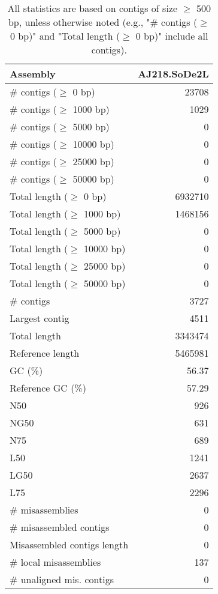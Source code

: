 \documentclass[12pt,a4paper]{article}
\begin{document}
\begin{table}[ht]
\begin{center}
\caption{All statistics are based on contigs of size $\geq$ 500 bp, unless otherwise noted (e.g., "\# contigs ($\geq$ 0 bp)" and "Total length ($\geq$ 0 bp)" include all contigs).}
\begin{tabular}{|l*{1}{|r}|}
\hline
Assembly & AJ218.SoDe2L \\ \hline
\# contigs ($\geq$ 0 bp) & 23708 \\ \hline
\# contigs ($\geq$ 1000 bp) & 1029 \\ \hline
\# contigs ($\geq$ 5000 bp) & 0 \\ \hline
\# contigs ($\geq$ 10000 bp) & 0 \\ \hline
\# contigs ($\geq$ 25000 bp) & 0 \\ \hline
\# contigs ($\geq$ 50000 bp) & 0 \\ \hline
Total length ($\geq$ 0 bp) & 6932710 \\ \hline
Total length ($\geq$ 1000 bp) & 1468156 \\ \hline
Total length ($\geq$ 5000 bp) & 0 \\ \hline
Total length ($\geq$ 10000 bp) & 0 \\ \hline
Total length ($\geq$ 25000 bp) & 0 \\ \hline
Total length ($\geq$ 50000 bp) & 0 \\ \hline
\# contigs & 3727 \\ \hline
Largest contig & 4511 \\ \hline
Total length & 3343474 \\ \hline
Reference length & 5465981 \\ \hline
GC (\%) & 56.37 \\ \hline
Reference GC (\%) & 57.29 \\ \hline
N50 & 926 \\ \hline
NG50 & 631 \\ \hline
N75 & 689 \\ \hline
L50 & 1241 \\ \hline
LG50 & 2637 \\ \hline
L75 & 2296 \\ \hline
\# misassemblies & 0 \\ \hline
\# misassembled contigs & 0 \\ \hline
Misassembled contigs length & 0 \\ \hline
\# local misassemblies & 137 \\ \hline
\# unaligned mis. contigs & 0 \\ \hline

\end{tabular}
\end{center}
\end{table}
\end{document}
